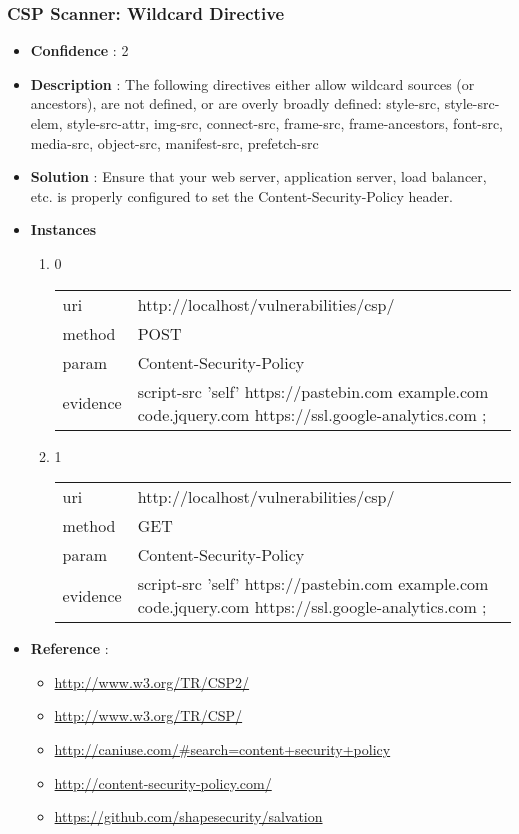 \documentclass[10pt]{article}
\begin{document}
\subsubsection{CSP Scanner: Wildcard Directive}
\begin{itemize}
\item[] \textbf{Confidence} : 2
\item[] \textbf{Description} : The following directives either allow wildcard sources (or ancestors), are not defined, or are overly broadly defined: style-src, style-src-elem, style-src-attr, img-src, connect-src, frame-src, frame-ancestors, font-src, media-src, object-src, manifest-src, prefetch-src
\item[] \textbf{Solution} :  Ensure that your web server, application server, load balancer, etc. is properly configured to set the Content-Security-Policy header.
\item[] \textbf{Instances}
\begin{enumerate}
\item[] 0
\begin{tabular}{| l | p{14cm}}
uri & http://localhost/vulnerabilities/csp/ \\
method & POST \\
param & Content-Security-Policy \\
evidence & script-src 'self' https://pastebin.com  example.com code.jquery.com https://ssl.google-analytics.com ; \\
\end{tabular}
\item[] 1
\begin{tabular}{| l | p{14cm}}
uri & http://localhost/vulnerabilities/csp/ \\
method & GET \\
param & Content-Security-Policy \\
evidence & script-src 'self' https://pastebin.com  example.com code.jquery.com https://ssl.google-analytics.com ; \\
\end{tabular}
\end{enumerate}
\item[] \textbf{Reference} : 
\begin{itemize}
\item \url{http://www.w3.org/TR/CSP2/}
\item \url{http://www.w3.org/TR/CSP/}
\item \url{http://caniuse.com/\#search=content+security+policy}
\item \url{http://content-security-policy.com/}
\item \url{https://github.com/shapesecurity/salvation}
\end{itemize}
\end{itemize}
\end{document}
